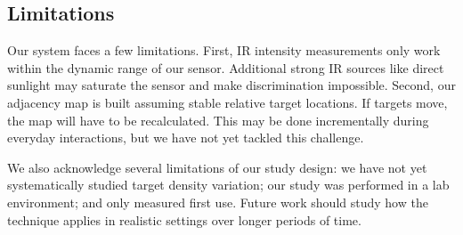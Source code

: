 
\subsection{Limitations}

Our system faces a few limitations. First, IR intensity measurements only work within the dynamic range of our sensor. Additional strong IR sources like direct sunlight may saturate the sensor and make discrimination impossible. Second, our adjacency map is built assuming stable relative target locations. If targets move, the map will have to be recalculated. This may be done incrementally during everyday interactions, but we have not yet tackled this challenge. 

We also acknowledge several limitations of our study design: we have not yet systematically studied target density variation; our study was performed in a lab environment; and only measured first use. Future work should study how the technique applies in realistic settings over longer periods of time.





